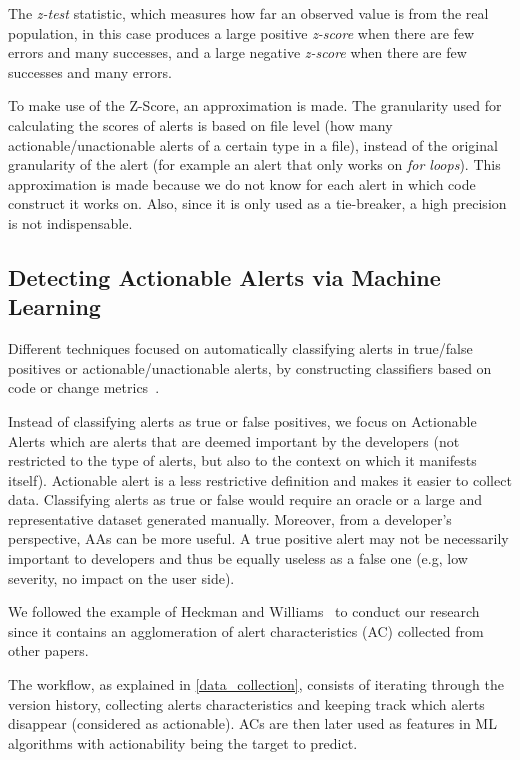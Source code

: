 The \textit{z-test} statistic, which measures how far an observed value is from the real population, in this case produces a large positive \textit{z-score} when there are few errors and many successes, and a large negative \textit{z-score} when there are few successes and many errors.

To make use of the Z-Score, an approximation is made. The granularity used for calculating the scores of alerts is based on file level (how many actionable/unactionable alerts of a certain type in a file), instead of the original granularity of the alert (for example an alert that only works on \textit{for loops}). This approximation is made because we do not know for each alert in which code construct it works on. Also, since it is only used as a tie-breaker, a high precision is not indispensable.

\subsection{Detecting Actionable Alerts via Machine Learning}

Different techniques focused on automatically classifying alerts in true/false positives or actionable/unactionable alerts, by constructing classifiers based on code or change metrics~\cite{actionable_sa, model_building_actionable}.

Instead of classifying alerts as true or false positives, we focus on Actionable Alerts which are alerts that are deemed important by the developers (not restricted to the type of alerts, but also to the context on which it manifests itself). Actionable alert is a less restrictive definition and makes it easier to collect data. Classifying alerts as true or false would require an oracle or a large and representative dataset generated manually. Moreover, from a developer's perspective, AAs can be more useful. A true positive alert may not be necessarily important to developers and thus be equally useless as a false one (e.g, low severity, no impact on the user side).

We followed the example of Heckman and Williams~\cite{model_building_actionable} to conduct our research since it contains an agglomeration of alert characteristics (AC) collected from other papers.

The workflow, as explained in \cref{data_collection}, consists of iterating through the version history, collecting alerts characteristics and keeping track which alerts disappear (considered as actionable). ACs are then later used as features in ML algorithms with actionability being the target to predict.

